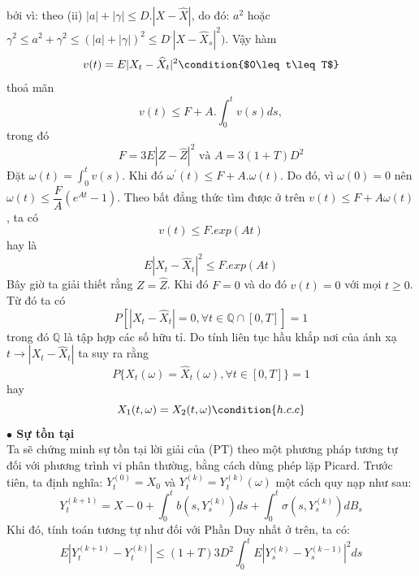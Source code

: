 \documentclass[14pt,a4paper]{article}
\numberwithin{equation}{section}
\begin{document}
bởi vì: theo (ii) $|a|+|\gamma|\leq D.|X-\widehat{X}|$, do đó: $a^2$ hoặc $\gamma^2\leq a^2+\gamma^2\leq (|a|+|\gamma|)^2\leq D^.|X-\widehat{X}_s|^2)$. Vậy hàm
\begin{equation*}
	v(t)=E|X_t-\widehat{X}_t|^2\condition{$0\leq t\leq T$}
\end{equation*}
thoả mãn
\begin{equation*}
	v(t)\leq F+A.\int_0^tv(s)ds,
\end{equation*}
trong đó 
\begin{equation*}
	F=3E|Z-\widehat{Z}|^2\text{ và }A=3(1+T)D^2
\end{equation*}
Đặt $\omega(t)=\int_0^tv(s)$. Khi đó $\omega^'(t)\leq F+A.\omega(t)$. Do đó, vì $\omega(0)=0$ nên $\omega(t)\leq\dfrac{F}{A}(e^{At}-1)$. Theo bất đẳng thức tìm được ở trên $v(t)\leq F+A\omega(t)$, ta có
\begin{equation*}
	v(t)\leq F.exp(At)
\end{equation*}
hay là
\begin{equation*}
	E|X_t-\widehat{X}_t|^2\leq F.exp(At)
\end{equation*}
Bây giờ ta giải thiết rằng $Z=\widehat{Z}$. Khi đó $F=0$ và do đó $v(t)=0$ với mọi $t\geq 0$. Từ đó ta có
\begin{equation*}
	P[|X_t-\widehat{X}_t|=0,\forall t\in \mathbb{Q}\cap[0,T]]=1
\end{equation*}
trong đó $\mathbb{Q}$ là tập hợp các số hữu tỉ. Do tính liên tục hầu khắp nơi của ánh xạ $t\rightarrow|X_t-\widehat{X}_t|$ ta suy ra rằng
\begin{equation*}
	P\{X_t(\omega)=\widehat{X}_t(\omega),\forall t\in[0,T]\}=1
\end{equation*}
hay
\begin{equation*}
	X_1(t,\omega)=X_2(t,\omega)\condition{h.c.c}
\end{equation*}
\textbf{$\bullet$ Sự tồn tại}\\
Ta sẽ chứng minh sự tồn tại lời giải của (PT) theo một phương pháp tương tự đối với phương trình vi phân thường, bằng cách dùng phép lặp Picard. Trước tiên, ta định nghĩa: $Y_t^{(0)}=X_0$ và $Y_t^{(k)}=Y_t^{(k)}(\omega)$ một cách quy nạp như sau:
\begin{equation}\label{eq:stt1}
	Y_t^{(k+1)}=X-0+\int_0^tb(s,Y_s^{(k)})ds+\int_0^t\sigma(s,Y_s^{(k)})dB_s
\end{equation}
Khi đó, tính toán tương tự như đối với Phần Duy nhất ở trên, ta có:
\begin{equation}\label{eq:stt2}
	E|Y_t^{(k+1)}-Y_t^{(k)}|\leq(1+T)3D^2\int_0^tE|Y^{(k)}_s-Y^{(k-1)}_s|^2ds
\end{equation}
\end{document}
